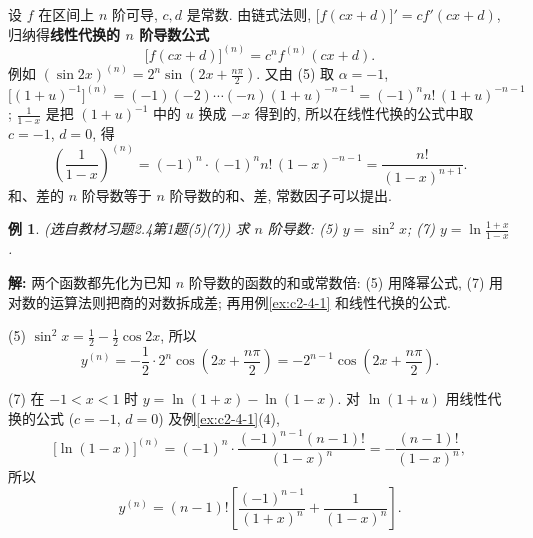 \documentclass[UTF8,openany]{ctexbook}
\theoremstyle{chinesetextbook}
\newtheorem{example}{例}[section]
\newenvironment{cnsolution}{\par\indent\textbf{解:} \ignorespaces}{\par}
\begin{document}
设 $f$ 在区间上 $n$ 阶可导, $c,d$ 是常数. 由链式法则, $\bigl[f(cx+d)\bigr]'=cf'(cx+d)$, 归纳得\textbf{线性代换的 $n$ 阶导数公式}
\[
\bigl[f(cx+d)\bigr]^{(n)}=c^nf^{(n)}(cx+d).
\]
例如 $\displaystyle(\sin2x)^{(n)}=2^n\sin\left(2x+\frac{n\pi}2\right)$. 又由 (5) 取 $\alpha=-1$, $\bigl[(1+u)^{-1}\bigr]^{(n)}=(-1)(-2)\cdots(-n)(1+u)^{-n-1}=(-1)^nn!\,(1+u)^{-n-1}$; $\displaystyle\frac1{1-x}$ 是把 $(1+u)^{-1}$ 中的 $u$ 换成 $-x$ 得到的, 所以在线性代换的公式中取 $c=-1$, $d=0$, 得
\[
\left(\frac1{1-x}\right)^{(n)}=(-1)^n\cdot(-1)^nn!\,(1-x)^{-n-1}=\frac{n!}{(1-x)^{n+1}}.
\]
和、差的 $n$ 阶导数等于 $n$ 阶导数的和、差, 常数因子可以提出.
\begin{example}\label{ex:c2-h4-1}
\textnormal{(选自教材习题2.4第1题(5)(7))} 求 $n$ 阶导数: (5) $y=\sin^2x$; (7) $\displaystyle y=\ln\frac{1+x}{1-x}$.
\end{example}
\begin{cnsolution}
两个函数都先化为已知 $n$ 阶导数的函数的和或常数倍: (5) 用降幂公式, (7) 用对数的运算法则把商的对数拆成差; 再用例\ref{ex:c2-4-1} 和线性代换的公式.

(5) $\displaystyle\sin^2x=\frac12-\frac12\cos2x$, 所以
\[
y^{(n)}=-\frac12\cdot2^n\cos\left(2x+\frac{n\pi}2\right)=-2^{n-1}\cos\left(2x+\frac{n\pi}2\right).
\]

(7) 在 $-1<x<1$ 时 $y=\ln(1+x)-\ln(1-x)$. 对 $\ln(1+u)$ 用线性代换的公式 ($c=-1$, $d=0$) 及例\ref{ex:c2-4-1}(4),
\[
\bigl[\ln(1-x)\bigr]^{(n)}=(-1)^n\cdot\frac{(-1)^{n-1}(n-1)!}{(1-x)^n}=-\frac{(n-1)!}{(1-x)^n},
\]
所以
\[
y^{(n)}=(n-1)!\left[\frac{(-1)^{n-1}}{(1+x)^n}+\frac1{(1-x)^n}\right].
\]
\end{cnsolution}
\end{document}
